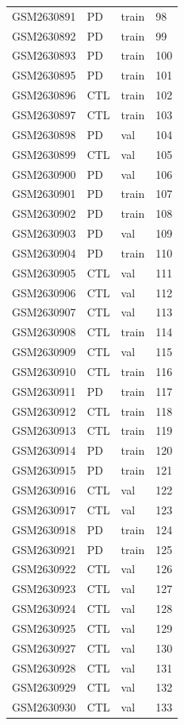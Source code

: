 \begin{footnotesize}
\begin{longtable}{llll}
GSM2630891 & PD & train & 98 \\
GSM2630892 & PD & train & 99 \\
GSM2630893 & PD & train & 100 \\
GSM2630895 & PD & train & 101 \\
GSM2630896 & CTL & train & 102 \\
GSM2630897 & CTL & train & 103 \\
GSM2630898 & PD & val & 104 \\
GSM2630899 & CTL & val & 105 \\
GSM2630900 & PD & val & 106 \\
GSM2630901 & PD & train & 107 \\
GSM2630902 & PD & train & 108 \\
GSM2630903 & PD & val & 109 \\
GSM2630904 & PD & train & 110 \\
GSM2630905 & CTL & val & 111 \\
GSM2630906 & CTL & val & 112 \\
GSM2630907 & CTL & val & 113 \\
GSM2630908 & CTL & train & 114 \\
GSM2630909 & CTL & val & 115 \\
GSM2630910 & CTL & train & 116 \\
GSM2630911 & PD & train & 117 \\
GSM2630912 & CTL & train & 118 \\
GSM2630913 & CTL & train & 119 \\
GSM2630914 & PD & train & 120 \\
GSM2630915 & PD & train & 121 \\
GSM2630916 & CTL & val & 122 \\
GSM2630917 & CTL & val & 123 \\
GSM2630918 & PD & train & 124 \\
GSM2630921 & PD & train & 125 \\
GSM2630922 & CTL & val & 126 \\
GSM2630923 & CTL & val & 127 \\
GSM2630924 & CTL & val & 128 \\
GSM2630925 & CTL & val & 129 \\
GSM2630927 & CTL & val & 130 \\
GSM2630928 & CTL & val & 131 \\
GSM2630929 & CTL & val & 132 \\
GSM2630930 & CTL & val & 133 \\

\end{longtable}
\end{footnotesize}
